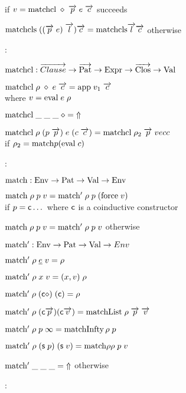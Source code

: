 \begin{description}
\begin{description}
if $ v = \mathrm{matchcl} \; \diamond \; \overrightarrow{p} \; e \;  \overrightarrow{c} $ succeeds
\item
$ \mathrm{matchcls} \; ((\overrightarrow{p} \; e)\;\overrightarrow{l}) \overrightarrow{c} = \mathrm{matchcls} \overrightarrow{l} \overrightarrow{c} $ otherwise  
\end{description}
\item[clause matching]:
\begin{description}
\item
$\mathrm{matchcl} : \overrightarrow{Clause} \rightarrow \overrightarrow{\mathrm{Pat}} \rightarrow \mathrm{Expr} \rightarrow \overrightarrow{\mathrm{Clos}} \rightarrow \mathrm{Val}$
\item
$\mathrm{matchcl} \; \rho \; \diamond \; e \; \overrightarrow{c} = \mathrm{app} \; v_1 \; \overrightarrow{c} $\\
where $ v = \mathrm{eval} \; e \; \rho$
\item
$\mathrm{matchcl} \; \_ \; \_\; \_ \; \diamond = \;\Uparrow$
\item
$\mathrm{matchcl} \; \rho \; (p \; \overrightarrow{p}) \; e \; (c \; \overrightarrow{c}) = \mathrm{matchcl} \; \rho_2 \; \overrightarrow{p} \; vec{c} $ \\
if $ \rho_2 = \mathrm{match} p (\mathrm{eval} \; c) $  
\end{description}
\item[pattern matching]:
\begin{description}
\item
$\mathrm{match} : \mathrm{Env} \rightarrow \mathrm{Pat} \rightarrow \mathrm{Val} \rightarrow \mathrm{Env}$
\item
$\mathrm{match} \; \rho \; p \; v = \mathrm{match'} \; \rho \; p \; (\mathrm{force} \; v) $\\
 if $ p = \mathsf{c} \dots $ where $\mathsf{c}$ is a coinductive constructor
\item
$\mathrm{match} \; \rho \; p \; v = \mathrm{match'} \; \rho \; p \; v $ otherwise
\item
$\mathrm{match'} : \mathrm{Env} \rightarrow \mathrm{Pat} \rightarrow \mathrm{Val} \rightarrow Env $
\item
$\mathrm{match'} \; \rho \; \underline{e} \; v = \rho $
\item
$\mathrm{match'} \; \rho \; x \; v = (x,v)\; \rho $
\item
$\mathrm{match'} \; \rho \; (\mathsf{c} \diamond) \; (\mathsf{c}) = \rho $
\item
$\mathrm{match'} \; \rho \; (\mathsf{c} \overrightarrow{p}) (\mathsf{c} \overrightarrow{v}) = \mathrm{matchList} \; \rho \; \overrightarrow{p} \; \overrightarrow{v} $
\item
$\mathrm{match'} \; \rho \; p \; \infty = \mathrm{matchInfty} \, \rho \; p $
\item
$\mathrm{match'} \; \rho \; (\mathsf{s}\; p) \; (\mathsf{s}\; v) = \mathrm{match} \rho \rho \; p \; v $
\item
$\mathrm{match'} \; \_ \; \_ \; \_ = \;\Uparrow $ otherwise
\end{description}
\item[pattern matching against infty]:
\begin{description}

\end{description}
\end{description}
